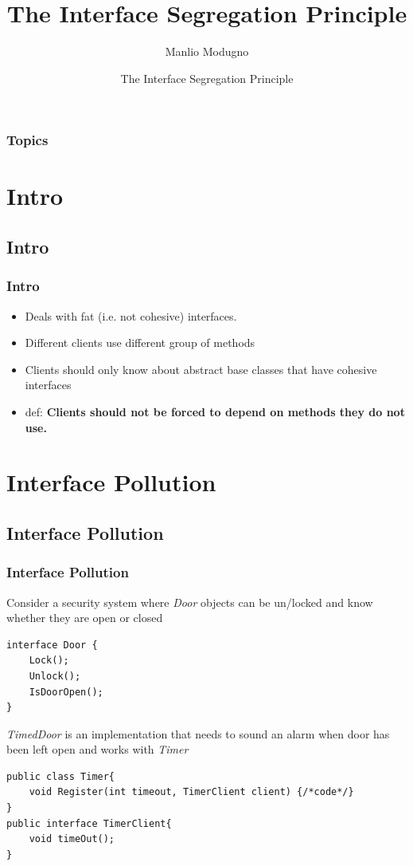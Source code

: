 \documentclass{beamer}
\title{The Interface Segregation Principle}
\author{Manlio Modugno}
\institute[GMTechnologies]
\date[]{The Interface Segregation Principle}
\begin{document}
\begin{frame}
  \titlepage
\end{frame}

\begin{frame}
  \frametitle{Topics}
  \tableofcontents
\end{frame}


\section{Intro}
\subsection{Intro}
\begin{frame}
  \frametitle{Intro}
  \begin{itemize}
	\item<+-> Deals with fat (i.e. not cohesive) interfaces.
	\item<+-> Different clients use different group of methods 
	\item<+-> Clients should only know about abstract base classes that have cohesive interfaces 
	\item<+-> def: \textbf{Clients should not be forced to depend on methods they do not use.}
   \end{itemize}
\end{frame}

\section{Interface Pollution}
\subsection{Interface Pollution}
\begin{frame}[containsverbatim]
	\frametitle{Interface Pollution}
	Consider a security system where \textit{Door} objects can be un/locked and know whether they are open or closed\\
	\begin{lstlisting}
interface Door {
	Lock();
	Unlock();
	IsDoorOpen();
}
	\end{lstlisting}
\textit{TimedDoor} is an implementation that needs to sound an alarm when door has been left open and works with \textit{Timer}\\
	\begin{lstlisting}
public class Timer{
	void Register(int timeout, TimerClient client) {/*code*/}
}
public interface TimerClient{
	void timeOut();
}
	\end{lstlisting}
\end{frame}
\end{document}
